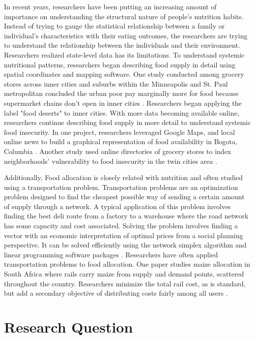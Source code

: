 \documentclass{report}
\begin{document}
In recent years, researchers have been putting an increasing amount of importance on understanding the structural nature of people's nutrition habits. Instead of trying to gauge the statistical relationship between a family or individual's characteristics with their eating outcomes, the researchers are trying to understand the relationship between the individuals and their environment. Researchers realized state-level data has its limitations. To understand systemic nutritional patterns, researchers began describing food supply in detail using spatial coordinates and mapping software.  One study conducted among grocery stores across inner cities and suburbs within the Minneapolis and St. Paul metropolitan concluded the urban poor pay marginally more for food because supermarket chains don't open in inner cities \cite{Chung}. Researchers began applying the label "food deserts" to inner cities. With more data becoming available online, researchers continue describing food supply in more detail to understand systemic food insecurity. In one project, researchers leveraged Google Maps, and local online news to build a graphical representation of food availability in Bogota, Columbia \cite{Hwang}. Another study used online directories of grocery stores to index neighborhoods' vulnerability to food insecurity in the twin cities area \cite{Larson}.

Additionally, Food allocation is closely related with nutrition and often studied using a transportation problem. Transportation problems are an optimization problem designed to find the cheapest possible way of sending a certain amount of supply through a network. A typical application of this problem involves finding the best deli route from a factory to a warehouse where the road network has some capacity and cost associated. Solving the problem involves finding a vector with an economic interpretation of optimal prices from a social planning perspective. It can be solved efficiently using the network simplex algorithm and linear programming software packages \cite{Cook}. Researchers have often applied transportation problems to food allocation. One paper studies maize allocation in South Africa where rails carry maize from supply and demand points, scattered throughout the country. Researchers minimize the total rail cost, as is standard, but add a secondary objective of distributing costs fairly among all users \cite{Stewart}.

\section{Research Question} 
\end{document}
